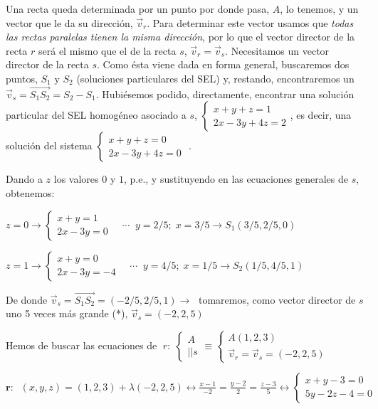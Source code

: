 \begin{proofw}\renewcommand{\qedsymbol}{$\diamond$}

Una recta queda determinada por un punto por donde pasa, $A$, lo tenemos, y un vector que le da su dirección, $\vec v_r$. Para determinar este vector usamos que \textit{todas las rectas paralelas tienen la misma dirección}, por lo que el vector director de la recta $r$ será el mismo que el de la recta $s$, $\vec v_r=\vec v_s$. Necesitamos un vector director de la recta $s$. Como ésta viene dada en forma general, buscaremos dos puntos, $S_1 \text{ y } S_2$ (soluciones particulares del SEL) y, restando, encontraremos un $\vec v_s=\overrightarrow{S_1S_2}=S_2-S_1$. \textcolor{gris}{Hubiésemos podido, directamente, encontrar una solución particular del SEL homogéneo asociado a $s$, \tiny{$\begin{cases} x+y+z=1\\2x-3y+4z=2 \end{cases}$}\normalsize{,} es decir, una solución del sistema  \tiny{$\begin{cases} x+y+z=0\\2x-3y+4z=0 \end{cases}$} \normalsize{.}}

Dando a $z$ los valores $0$ y $1$, p.e., y sustituyendo en las ecuaciones generales de $s$, obtenemos:

\noindent $z=0 \to \begin{cases} x+y=1\\2x-3y=0 \end{cases} \quad \cdots \; \; y=2/5;\; x=3/5 \to S_1(3/5,2/5,0)$

\noindent $z=1 \to \begin{cases} x+y=0\\2x-3y=-4 \end{cases} \quad \cdots \; \; y=4/5;\; x=1/5 \to S_2(1/5,4/5,1)$

De donde $\vec v_s=\overrightarrow{S_1S_2}=(-2/5,2/5,1) \to \;$ tomaremos, como vector director de $s$ uno 5 veces más grande (*), $\vec v_s=(-2,2,5)$

Hemos de buscar las ecuaciones de $\; r:\; \begin{cases}A\\ ||s\end{cases} \equiv \begin{cases} A(1,2,3) \\\vec v_r=\vec v_s=(-2,2,5) \end{cases}$

\noindent \small{$\boldsymbol{r}:\;\;(x,y,z)=(1,2,3)+\lambda(-2,2,5) \leftrightarrow \frac{x-1}{-2}=\frac{y-2}{2}=\frac{z-3}{5} \leftrightarrow \begin{cases} x+y-3=0\\5y-2z-4=0 \end{cases}$} 


\end{proofw}
